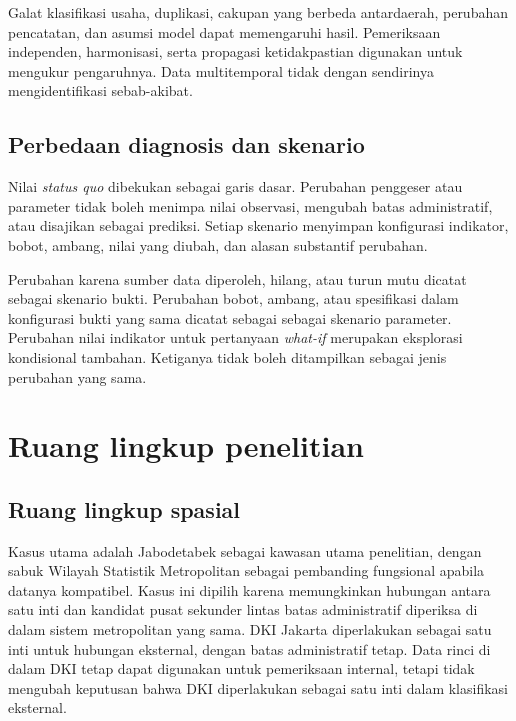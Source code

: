 \documentclass[11pt,a4paper,oneside,openany,indonesian]{report}
\begin{document}
Galat klasifikasi usaha, duplikasi, cakupan yang berbeda antardaerah,
perubahan pencatatan, dan asumsi model dapat memengaruhi hasil.
Pemeriksaan independen, harmonisasi, serta propagasi ketidakpastian
digunakan untuk mengukur pengaruhnya. Data multitemporal tidak dengan
sendirinya mengidentifikasi sebab-akibat.

\subsection{Perbedaan diagnosis dan
skenario}\label{perbedaan-diagnosis-dan-skenario}

Nilai \emph{status quo} dibekukan sebagai garis dasar. Perubahan
penggeser atau parameter tidak boleh menimpa nilai observasi, mengubah
batas administratif, atau disajikan sebagai prediksi. Setiap skenario
menyimpan konfigurasi indikator, bobot, ambang, nilai yang diubah, dan
alasan substantif perubahan.

Perubahan karena sumber data diperoleh, hilang, atau turun mutu dicatat
sebagai skenario bukti. Perubahan bobot, ambang, atau
spesifikasi dalam konfigurasi bukti yang sama dicatat sebagai
sebagai skenario parameter. Perubahan nilai indikator untuk pertanyaan
\emph{what-if} merupakan eksplorasi kondisional tambahan. Ketiganya
tidak boleh ditampilkan sebagai jenis perubahan yang sama.

\section{Ruang lingkup penelitian}\label{ruang-lingkup-penelitian}

\subsection{Ruang lingkup spasial}\label{ruang-lingkup-spasial}

Kasus utama adalah Jabodetabek sebagai kawasan utama penelitian, dengan
sabuk Wilayah Statistik Metropolitan sebagai pembanding fungsional
apabila datanya kompatibel. Kasus ini dipilih karena memungkinkan
hubungan antara satu inti dan kandidat pusat sekunder lintas batas
administratif diperiksa di dalam sistem metropolitan yang sama. DKI
Jakarta diperlakukan sebagai satu inti untuk hubungan eksternal, dengan
batas administratif tetap. Data rinci di dalam DKI tetap dapat digunakan
untuk pemeriksaan internal, tetapi tidak mengubah keputusan bahwa DKI
diperlakukan sebagai satu inti dalam klasifikasi eksternal.
\end{document}
